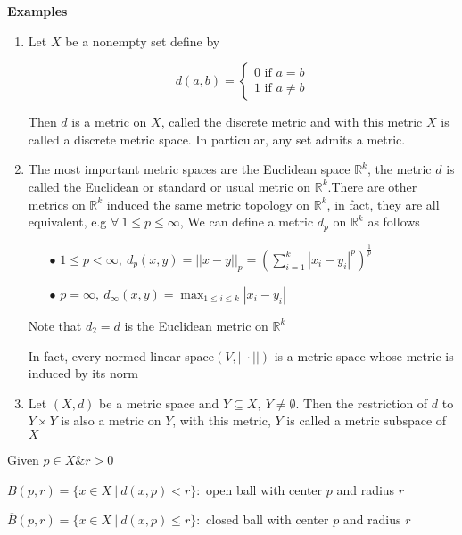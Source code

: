 \textbf{Examples}

\begin{enumerate}
	\item Let $X$ be a nonempty set define by
	
	$$d(a,b) = \begin{cases}
		0 \text{ if } a = b\\ 1 \text{ if } a \neq b
	\end{cases}$$
	
	Then $d$ is a metric on $X$, called the discrete metric and with this metric $X$ is called a discrete metric space. In particular, any set admits a metric.
	\item The most important metric spaces are the Euclidean space $\mathbb R^k$, the metric $d$ is called the Euclidean or standard or usual metric on $\mathbb R^k$.There are other metrics on $\mathbb R^k$ induced the same metric topology on $\mathbb R^k$, in fact, they are all equivalent, e.g $\forall~ 1 \leq p \leq \infty$, We can define a metric $d_p$ on $\mathbb R^k$ as follows
		\begin{enumerate}
			\item[$\bullet$] $1 \leq p < \infty,~d_p(x,y) = ||x-y||_p = \left( \sum^k_{i=1}|x_i-y_i|^p\right)^{\frac{1}{p}}$
			\item[$\bullet$] $p = \infty,~d_{\infty}(x,y) = \max_{1 \leq i \leq k}|x_i - y_i|$
		\end{enumerate}
		
		Note that $d_2 = d$ is the Euclidean metric on $\mathbb R^k$
		
		\begin{rmk*}
			In fact, every normed linear space$(V,||\cdot||)$ is a metric space whose metric is induced by its norm
		\end{rmk*}
	\item Let $(X,d)$ be a metric space and $Y \subseteq X,~Y \neq \emptyset$. Then the restriction of $d$ to $Y \times Y$ is also a metric on $Y$, with this metric, $Y$ is called a metric subspace of $X$
	
\end{enumerate}

\newpage

\begin{defn}[ball]
	Given $p \in X \& r > 0$
	
	$B(p,r) = \{x \in X ~|~ d(x,p) < r\}:$ open ball with center $p$ and radius $r$
	
	$\overline{B}(p,r) = \{x \in X ~|~ d(x,p) \leq r\}:$ closed ball with center $p$ and radius $r$ 
\end{defn}


